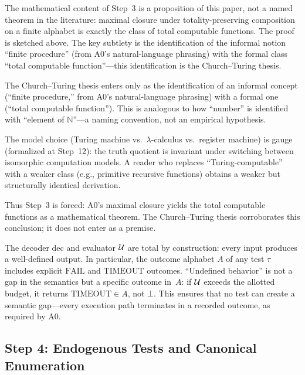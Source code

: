 \begin{remark}
\label{app:rem:ct-localization}
The mathematical content of Step~3 is a proposition of this paper, not a
named theorem in the literature: maximal closure under totality-preserving
composition on a finite alphabet is exactly the class of total computable
functions.  The proof is sketched above.  The key subtlety is the
identification of the informal notion ``finite procedure'' (from A0's
natural-language phrasing) with the formal class ``total computable
function''---this identification is the Church--Turing thesis.

The Church--Turing thesis enters only as the identification of an
informal concept (``finite procedure,'' from A0's natural-language
phrasing) with a formal one (``total computable function'').  This is
analogous to how ``number'' is identified with ``element of
$\mathbb{N}$''---a naming convention, not an empirical hypothesis.

The model choice (Turing machine vs.\ $\lambda$-calculus vs.\ register
machine) is gauge (formalized at Step~12): the truth quotient is
invariant under switching between isomorphic computation models.  A
reader who replaces ``Turing-computable'' with a weaker class (e.g.,
primitive recursive functions) obtains a weaker but structurally
identical derivation.

Thus Step~3 is forced: A0's maximal closure yields the total computable
functions as a mathematical theorem.  The Church--Turing thesis
corroborates this conclusion; it does not enter as a premise.
\end{remark}

\begin{remark}
\label{app:rem:total-semantics}
The decoder $\mathrm{dec}$ and evaluator $\mathcal{U}$ are total by
construction: every input produces a well-defined output.  In
particular, the outcome alphabet $A$ of any test $\tau$ includes
explicit $\mathrm{FAIL}$ and $\mathrm{TIMEOUT}$ outcomes.
``Undefined behavior'' is not a gap in the semantics but a
specific outcome in~$A$: if $\mathcal{U}$ exceeds the allotted budget,
it returns $\mathrm{TIMEOUT} \in A$, not $\bot$.  This ensures
that no test can create a semantic gap---every execution path
terminates in a recorded outcome, as required by A0.
\end{remark}


\subsection{Step 4: Endogenous Tests and Canonical Enumeration}\label{app:step4}

